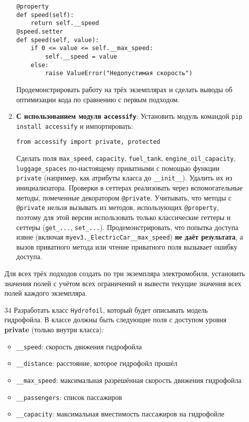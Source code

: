 \begin{enumerate}
\begin{enumerate}
\begin{verbatim}
@property
def speed(self):
    return self.__speed
@speed.setter
def speed(self, value):
    if 0 <= value <= self.__max_speed:
        self.__speed = value
    else:
        raise ValueError("Недопустимая скорость")
    \end{verbatim}  
    Продемонстрировать работу на трёх экземплярах и сделать выводы об оптимизации кода по сравнению с первым подходом.
    \item \textbf{С использованием модуля \texttt{accessify}}:  
    Установить модуль командой \texttt{pip install accessify} и импортировать:  
    \begin{verbatim}
from accessify import private, protected
    \end{verbatim}  
    Сделать поля \texttt{max\_speed}, \texttt{capacity}, \texttt{fuel\_tank}, \texttt{engine\_oil\_capacity}, \texttt{luggage\_spaces} по-настоящему приватными с помощью функции \texttt{private} (например, как атрибуты класса до \texttt{\_\_init\_\_}). Удалить их из инициализатора.  
    Проверки в сеттерах реализовать через вспомогательные методы, помеченные декоратором \texttt{@private}.  
    Учитывать, что методы с \texttt{@private} нельзя вызывать из методов, использующих \texttt{@property}, поэтому для этой версии использовать только классические геттеры и сеттеры (\texttt{get\_...}, \texttt{set\_...}).  
    Продемонстрировать, что попытка доступа извне (включая \texttt{myev3.\_ElectricCar\_\_max\_speed}) \textbf{не даёт результата}, а вызов приватного метода или чтение приватного поля вызывает ошибку доступа.
\end{enumerate}
Для всех трёх подходов создать по три экземпляра электромобиля, установить значения полей с учётом всех ограничений и вывести текущие значения всех полей каждого экземпляра.
\item[34] Разработать класс \texttt{Hydrofoil}, который будет описывать модель гидрофойла. В классе должны быть следующие поля с доступом уровня \textbf{private} (только внутри класса):
\begin{itemize}
    \item \texttt{\_\_speed}: скорость движения гидрофойла  
    \item \texttt{\_\_distance}: расстояние, которое гидрофойл прошёл  
    \item \texttt{\_\_max\_speed}: максимальная разрешённая скорость движения гидрофойла  
    \item \texttt{\_\_passengers}: список пассажиров  
    \item \texttt{\_\_capacity}: максимальная вместимость пассажиров на гидрофойле  

\end{itemize}
\end{enumerate}
